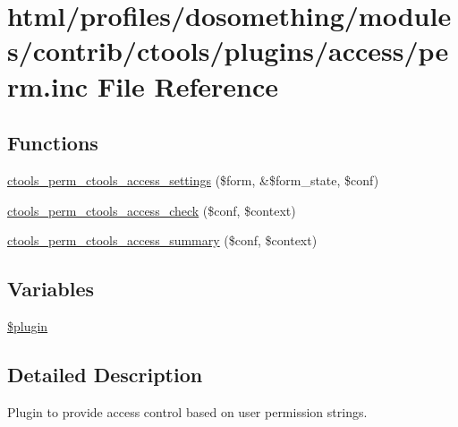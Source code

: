 \hypertarget{perm_8inc}{
\section{html/profiles/dosomething/modules/contrib/ctools/plugins/access/perm.inc File Reference}
\label{perm_8inc}
}
\subsection*{Functions}
\begin{DoxyCompactItemize}
\item 
\hyperlink{perm_8inc_a1b0f1547b822f454c938df219bba9109}{ctools\_\-perm\_\-ctools\_\-access\_\-settings} (\$form, \&\$form\_\-state, \$conf)
\item 
\hyperlink{perm_8inc_ab51689e36183f14bde88d71fba747427}{ctools\_\-perm\_\-ctools\_\-access\_\-check} (\$conf, \$context)
\item 
\hyperlink{perm_8inc_a80ae31516154a82e7fb0ef273b68ebcc}{ctools\_\-perm\_\-ctools\_\-access\_\-summary} (\$conf, \$context)
\end{DoxyCompactItemize}
\subsection*{Variables}
\begin{DoxyCompactItemize}
\item 
\hyperlink{perm_8inc_ada8a7130088351710bb02ed622d6bf65}{\$plugin}
\end{DoxyCompactItemize}


\subsection{Detailed Description}
Plugin to provide access control based on user permission strings. 

